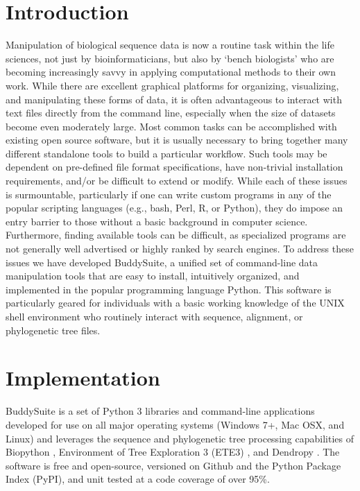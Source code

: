 \documentclass[nogrid]{MBE_article}%
\begin{document}
\section{{Introduction}\label{sec:Intro}}
Manipulation of biological sequence data is now a routine task within the life sciences, not just by bioinformaticians, but also by `bench biologists' who are becoming increasingly savvy in applying computational methods to their own work. While there are excellent graphical platforms for organizing, visualizing, and manipulating these forms of data, it is often advantageous to interact with text files directly from the command line, especially when the size of datasets become even moderately large. Most common tasks can be accomplished with existing open source software, but it is usually necessary to bring together many different standalone tools to build a particular workflow. Such tools may be dependent on pre-defined file format specifications, have non-trivial installation requirements, and/or be difficult to extend or modify. While each of these issues is surmountable, particularly if one can write custom programs in any of the popular scripting languages (e.g., bash, Perl, R, or Python), they do impose an entry barrier to those without a basic background in computer science. Furthermore, finding available tools can be difficult, as specialized programs are not generally well advertised or highly ranked by search engines. To address these issues we have developed BuddySuite, a unified set of command-line data manipulation tools that are easy to install, intuitively organized, and implemented in the popular programming language Python. This software is particularly geared for individuals with a basic working knowledge of the UNIX shell environment who routinely interact with sequence, alignment, or phylogenetic tree files.

\section{Implementation}
BuddySuite is a set of Python 3 libraries and command-line applications developed for use on all major operating systems (Windows 7+, Mac OSX, and Linux) and leverages the sequence and phylogenetic tree processing capabilities of Biopython \cite{Cock:2009hj}, Environment of Tree Exploration 3 (ETE3) \cite{HuertaCepas:2016hw}, and Dendropy \cite{Sukumaran:2010id}. The software is free and open-source, versioned on Github \cite{github} and the Python Package Index \cite{pypi} (PyPI), and unit tested at a code coverage of over 95\%.
\end{document}
